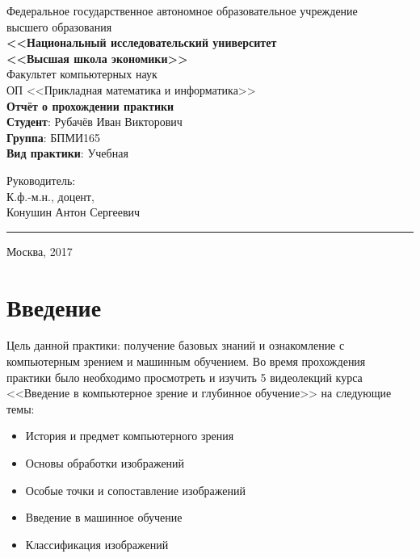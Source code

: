 \documentclass[12pt]{article}
\begin{document}
\begin{titlepage}
  \center
  Федеральное государственное автономное образовательное учреждение\\
  высшего образования \\[.2cm]
  \textbf{\large <<Национальный исследовательский университет\\
    <<Высшая школа экономики>>}\\[.2cm]
  Факультет компьютерных наук\\[.2cm]
  ОП <<Прикладная математика и информатика>>\\[4cm]
  \textbf{\LARGE Отчёт о прохождении практики}\\[2cm]
  {\flushleft
  \textbf{Студент}: Рубачёв Иван Викторович \\
  \textbf{Группа}: БПМИ165 \\
  \textbf{Вид практики}: Учебная\\[8cm]}

  \begin{multicols}{3}
    {\flushleft \scriptsize Руководитель:\\
    }
    {\flushleft \scriptsize К.ф.-м.н., доцент, \\
      Конушин Антон Сергеевич\\}
    {\vskip5mm\rule{5cm}{0.15mm}}
  \end{multicols}

  Москва, 2017
\end{titlepage}

{
\hypersetup{linkcolor=black}
\tableofcontents
}

\newpage

\section*{Введение}
%

Цель данной практики: получение базовых знаний и ознакомление с компьютерным зрением и машинным обучением. Во время прохождения практики было необходимо просмотреть и изучить 5 видеолекций курса <<Введение в компьютерное зрение и глубинное обучение>> на следующие темы:

\begin{itemize}
  \item История и предмет компьютерного зрения
  \item Основы обработки изображений
  \item Особые точки и сопоставление изображений
  \item Введение в машинное обучение
  \item Классификация изображений
\end{itemize}
\end{document}

